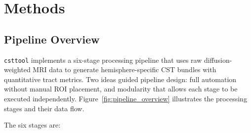 
\chapter{Methods}
\label{ch:methods}

\section{Pipeline Overview}
\label{sec:methods_pipeline}

\texttt{csttool} implements a six-stage processing pipeline that uses raw diffusion-weighted MRI data to generate hemisphere-specific CST bundles with quantitative tract metrics. Two ideas guided pipeline design: full automation without manual ROI placement, and modularity that allows each stage to be executed independently. Figure~\ref{fig:pipeline_overview} illustrates the processing stages and their data flow.

The six stages are:

